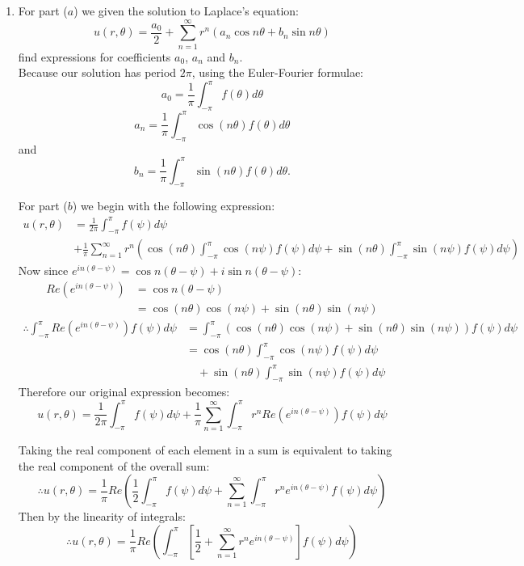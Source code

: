 \begin{enumerate}
    \newpage

    \item For part ($a$) we given the solution to Laplace's equation:
    $$u(r,\theta)=\frac{a_0}{2}+\sum_{n=1}^{\infty}r^n
    (a_n\cos n\theta+b_n\sin n\theta)$$
    find expressions for coefficients $a_0$, $a_n$ and $b_n$. \\

    Because our solution has period $2\pi$, using the Euler-Fourier formulae:
    $$a_0=\frac{1}{\pi}\int_{-\pi}^{\pi}f(\theta)d\theta$$
    $$a_n=\frac{1}{\pi}\int_{-\pi}^{\pi}
    \cos(n\theta) f(\theta)d\theta$$
    and
    $$b_n=\frac{1}{\pi}\int_{-\pi}^{\pi}
    \sin(n\theta) f(\theta)d\theta.$$

    For part ($b$) we begin with the following expression:
    \begin{align*}
        u(r,\theta)
        &=\frac{1}{2\pi}\int_{-\pi}^{\pi}f(\psi)d\psi \\
        &+\frac{1}{\pi}\sum_{n=1}^{\infty}r^n\left(\cos(n\theta)\int_{-\pi}^{\pi}\cos(n\psi)f(\psi)d\psi
        +\sin(n\theta)\int_{-\pi}^{\pi}\sin(n\psi)f(\psi)d\psi
        \right)
    \end{align*}
    Now since $e^{in(\theta-\psi)}=\cos n(\theta-\psi)+i\sin n(\theta-\psi)$:
    \begin{align*}
        Re(e^{in(\theta-\psi)})
        &=\cos n(\theta-\psi) \\
        &=\cos(n\theta)\cos(n\psi)+\sin(n\theta)\sin(n\psi)
    \end{align*}
    \begin{align*}
        \therefore\int_{-\pi}^{\pi}Re(e^{in(\theta-\psi)})f(\psi)d\psi
        &=\int_{-\pi}^{\pi}\left(\cos(n\theta)\cos(n\psi)+\sin
        (n\theta)\sin(n\psi)\right)f(\psi) d\psi \\
        &=\cos(n\theta)\int_{-\pi}^{\pi}\cos(n\psi)f(\psi)d\psi
        \\ &\quad+\sin(n\theta)\int_{-\pi}^{\pi}\sin(n\psi)f(\psi)d\psi
    \end{align*}
    Therefore our original expression becomes:
    $$u(r,\theta)
    =\frac{1}{2\pi}\int_{-\pi}^{\pi}f(\psi)d\psi
    +\frac{1}{\pi}\sum_{n=1}^{\infty}
    \int_{-\pi}^{\pi}r^nRe(e^{in(\theta-\psi)})f(\psi)d\psi$$

    \newpage

    Taking the real component of each element in a sum is equivalent to taking the real component of the overall sum:
    $$\therefore u(r,\theta)=
    \frac{1}{\pi}Re\left(\frac{1}{2}\int_{-\pi}^{\pi}f(\psi)d\psi
    +\sum_{n=1}^{\infty}
    \int_{-\pi}^{\pi}r^ne^{in(\theta-\psi)}f(\psi)d\psi\right)$$
    Then by the linearity of integrals:
    $$\therefore u(r,\theta)=
    \frac{1}{\pi}Re\left(\int_{-\pi}^{\pi}
    \left[\frac{1}{2}+
    \sum_{n=1}^{\infty}r^ne^{in(\theta-\psi)}\right]f(\psi)d\psi\right)$$


\end{enumerate}
